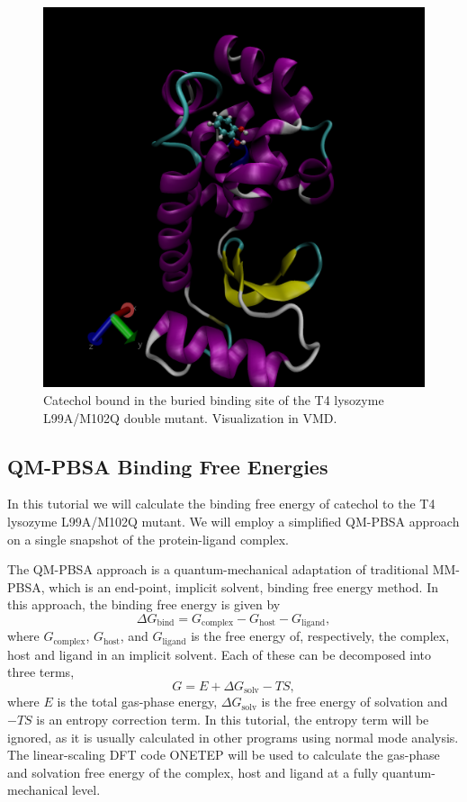 \documentclass{article}
\begin{document}
\begin{figure}
    \centering
    \includegraphics[width=\textwidth]{T4-Catechol.jpeg}
    \caption{Catechol bound in the buried binding site of the T4 lysozyme L99A/M102Q double mutant. Visualization in VMD.}
    \label{fig:T4}
\end{figure}

\subsection{QM-PBSA Binding Free Energies}
In this tutorial we will calculate the binding free energy of catechol to the T4 lysozyme L99A/M102Q mutant. We will employ a simplified QM-PBSA approach \cite{Fox2014,Gundelach2021} on a single snapshot of the protein-ligand complex. 

The QM-PBSA approach is a quantum-mechanical adaptation of traditional MM-PBSA, which is an end-point, implicit solvent, binding free energy method. In this approach, the binding free energy is given by
\begin{equation}
    \Delta G_{\textrm{bind}}= G_{\textrm{complex}} - G_{\textrm{host}} - G_{\textrm{ligand}},
    \label{net}
\end{equation}
where $G_{\textrm{complex}}$, $G_{\textrm{host}}$, and $G_{\textrm{ligand}}$ is the free energy of, respectively, the complex, host and ligand in an implicit solvent. Each of these can be decomposed into three terms,
\begin{equation}
    G=E + \Delta{}G_{\textrm{solv}} - TS,
    \label{energy_terms}
\end{equation}
where $E$ is the total gas-phase energy, $\Delta{}G_{\textrm{solv}}$ is the free energy of solvation and $-TS$ is an entropy correction term. In this tutorial, the entropy term will be ignored, as it is usually calculated in other programs using normal mode analysis. The linear-scaling DFT code ONETEP will be used to calculate the gas-phase and solvation free energy of the complex, host and ligand at a fully quantum-mechanical level. 
\end{document}
